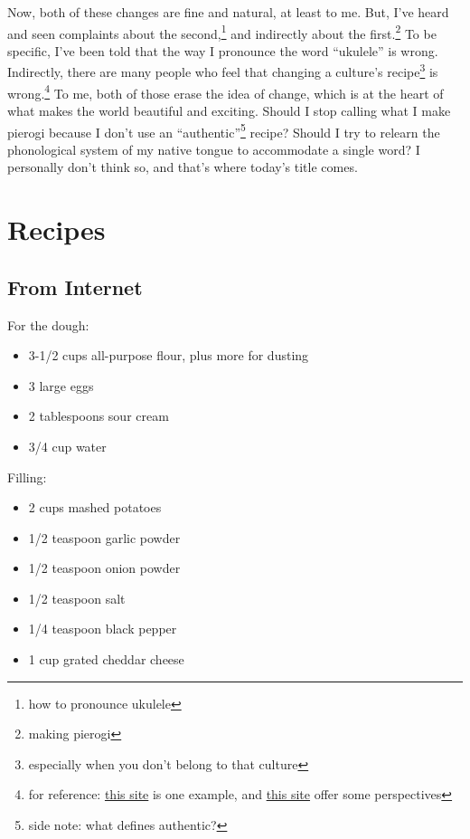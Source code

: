 \documentclass[12pt]{article}[titlepage]
\newcommand{\say}[1]{``#1''}
\newcommand{\1}{\={a}}
\newcommand{\2}{\={e}}
\newcommand{\3}{\={\i}}
\newcommand{\4}{\=o}
\newcommand{\5}{\=u}
\newcommand{\6}{\={A}}
\renewcommand{\,}{\textsuperscript{,}}
\begin{document}
Now, both of these changes are fine and natural, at least to me.
But, I've heard and seen complaints about the second,\footnote{how to pronounce ukulele} and indirectly about the first.\footnote{making pierogi}
To be specific, I've been told that the way I pronounce the word \say{ukulele} is wrong.
Indirectly, there are many people who feel that changing a culture's recipe\footnote{especially when you don't belong to that culture} is wrong.\footnote{for reference: \href{https://www.npr.org/sections/thesalt/2016/03/22/471309991/when-chefs-become-famous-cooking-other-cultures-food}{this site} is one example, and \href{http://www.baystbull.com/in-food-culture-is-appropriation-actually-possible/}{this site} offer some perspectives}
To me, both of those erase the idea of change, which is at the heart of what makes the world beautiful and exciting.
Should I stop calling what I make pierogi because I don't use an \say{authentic}\footnote{side note: what defines authentic?} recipe?
Should I try to relearn the phonological system of my native tongue to accommodate a single word?
I personally don't think so, and that's where today's title comes.

\section{Recipes}
\subsection{From Internet}
For the dough:
\begin{itemize}
    \item 3-1/2 cups all-purpose flour, plus more for dusting
    \item 3 large eggs
    \item 2 tablespoons sour cream
    \item 3/4 cup water
\end{itemize}

Filling:
\begin{itemize}
    \item 2 cups mashed potatoes
    \item 1/2 teaspoon garlic powder
    \item 1/2 teaspoon onion powder
    \item 1/2 teaspoon salt
    \item 1/4 teaspoon black pepper
    \item 1 cup grated cheddar cheese
\end{itemize}
\end{document}

